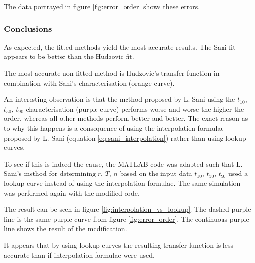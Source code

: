 The data portrayed in figure \ref{fig:error_order} shows these errors.

\subsubsection*{Conclusions}

As expected, the fitted methods yield  the  most  accurate results. The Sani fit
appears to be better than the Hudzovic fit.

The  most  accurate  non-fitted  method  is  Hudzovic's   transfer  function  in
combination with Sani's characterisation (orange curve).

An interesting observation is that the method proposed by L. Sani\cite{ref:sani}
using the $t_{10}$, $t_{50}$,  $t_{90}$ characterisation (purple curve) performs
worse and worse the higher the order, whereas all  other  methods perform better
and  better.  The exact reason as to why this happens is a consequence of  using
the    interpolation     formulae     proposed     by    L.    Sani    (equation
\ref{eq:sani_interpolation}) rather than using lookup curves.

To  see  if  this  is indeed the cause, the MATLAB code was adapted such that L.
Sani's  method  for determining $r$, $T$, $n$ based on the input data  $t_{10}$,
$t_{50}$, $t_{90}$ used  a  lookup  curve  instead  of  using  the interpolation
formulae. The same simulation was performed again with the modified code.

The result  can  be seen in figure \ref{fig:interpolation_vs_lookup}. The dashed
purple  line  is  the same purple curve from figure  \ref{fig:error_order}.  The
continuous purple line shows the result of the modification.

It appears that by using lookup curves the resulting  transfer  function is less
accurate than if interpolation formulae were used.
